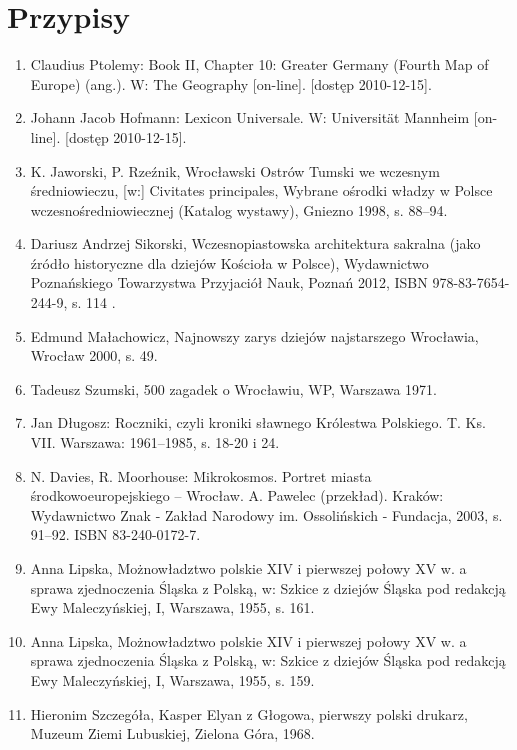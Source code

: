 \documentclass{article}
\begin{document}
\section {Przypisy}

\begin{enumerate}
\item Claudius Ptolemy: Book II, Chapter 10: Greater Germany (Fourth Map of Europe) (ang.). W: The Geography [on-line]. [dostęp 2010-12-15].\label{fig: [1]}
 \item Johann Jacob Hofmann: Lexicon Universale. W: Universität Mannheim [on-line]. [dostęp 2010-12-15].\label{fig: [2]}
 \item K. Jaworski, P. Rzeźnik, Wrocławski Ostrów Tumski we wczesnym średniowieczu, [w:] Civitates principales, Wybrane ośrodki władzy w Polsce wczesnośredniowiecznej (Katalog wystawy), Gniezno 1998, s. 88–94.\label{fig: [3]}
\item  Dariusz Andrzej Sikorski, Wczesnopiastowska architektura sakralna (jako źródło historyczne dla dziejów Kościoła w Polsce), Wydawnictwo Poznańskiego Towarzystwa Przyjaciół Nauk, Poznań 2012, ISBN 978-83-7654-244-9, s. 114 .\label{fig: [4]}
 \item Edmund Małachowicz, Najnowszy zarys dziejów najstarszego Wrocławia, Wrocław 2000, s. 49.\label{fig: [5]}
 \item Tadeusz Szumski, 500 zagadek o Wrocławiu, WP, Warszawa 1971.\label{fig: [6]}
 \item Jan Długosz: Roczniki, czyli kroniki sławnego Królestwa Polskiego. T. Ks. VII. Warszawa: 1961–1985, s. 18-20 i 24.\label{fig: [7]}
 \item N. Davies, R. Moorhouse: Mikrokosmos. Portret miasta środkowoeuropejskiego – Wrocław. A. Pawelec (przekład). Kraków: Wydawnictwo Znak - Zakład Narodowy im. Ossolińskich - Fundacja, 2003, s. 91–92. ISBN 83-240-0172-7.\label{fig: [8]}
 \item Anna Lipska, Możnowładztwo polskie XIV i pierwszej połowy XV w. a sprawa zjednoczenia Śląska z Polską, w: Szkice z dziejów Śląska pod redakcją Ewy Maleczyńskiej, I, Warszawa, 1955, s. 161.\label{fig: [9]}
 \item Anna Lipska, Możnowładztwo polskie XIV i pierwszej połowy XV w. a sprawa zjednoczenia Śląska z Polską, w: Szkice z dziejów Śląska pod redakcją Ewy Maleczyńskiej, I, Warszawa, 1955, s. 159.\label{fig: [10]}
 \item Hieronim Szczegóła, Kasper Elyan z Głogowa, pierwszy polski drukarz, Muzeum Ziemi Lubuskiej, Zielona Góra, 1968.\label{fig: [11]}

\end{enumerate}
\end{document}

